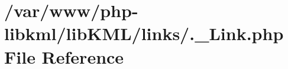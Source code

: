 \hypertarget{links_2_8__Link_8php}{
\section{/var/www/php-\/libkml/libKML/links/.\_\-Link.php File Reference}
\label{d8/dac/links_2_8__Link_8php}
}
